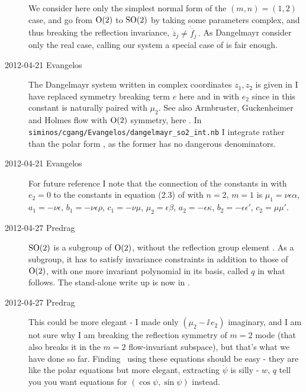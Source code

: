 \begin{description}
We consider here only the simplest normal form of the $(m,n ) = ( 1 ,2)$ case,
and go from  $\textrm{O}(2)$ to  $\textrm{SO}(2)$ by taking some parameters complex,
and thus breaking the reflection invariance, $\dot{\overline{z}}_j \neq
\dot{\overline{f}}_j \,.$ As Dangelmayr consider only the real case,
calling our system a special case of {\twoMode} is fair enough.

\item[2012-04-21 Evangelos]
The Dangelmayr system written in complex coordinates $z_1,z_2$
is given in  I have replaced symmetry breaking term $e$
here and in  with $e_2$ since in this constant is
naturally paired with $\mu_2$. See also Armbruster, Guckenheimer and
Holmes flow with $\textrm{O}(2)$ symmetry, here . In
\texttt{siminos/cgang/Evangelos/dangelmayr\_so2\_int.nb} I integrate
 rather than the polar form , as the
former has no dangerous denominators.

\item[2012-04-21 Evangelos] For future reference I note that the
connection of the constants in  with $e_2=0$ to the
constants in equation (2.3) of  with
$n=2$, $m=1$ is $\mu_1=\nu\epsilon\alpha$,
$a_1=-\nu\epsilon$, $b_1=-\nu\epsilon\rho$, $c_1=-\nu\mu$, $\mu_2=\epsilon\beta$,
$a_2=-\epsilon\kappa$, $b_2=-\epsilon\epsilon'$, $c_2=\mu\mu'$.

\item[2012-04-27 Predrag]
$\textrm{SO}(2)$ is a {subgroup} of $\textrm{O}(2)$, without the reflection group
element . As a subgroup, it has to satisfy invariance
constraints in addition to those of $\textrm{O}(2)$, with one more invariant
polynomial in its basis, called $q$ in what follows. The
stand-alone write up is now in .


\item[2012-04-27 Predrag] This could be more elegant - I made only
$(\mu_2-\ii\, e_2)$ imaginary, and I am not sure why I am breaking the
reflection symmetry of $m=2$ mode (that also breaks it in the $m=2$
flow-invariant subspace), but that's what we have done so far. Finding
\eqva\ using these equations should be easy - they are like the polar
equations but more elegant, extracting $\dot{\psi}$ is silly - $w$, $q$
tell you you want equations for $(\cos \psi, \sin \psi)$ instead.


\end{description}
